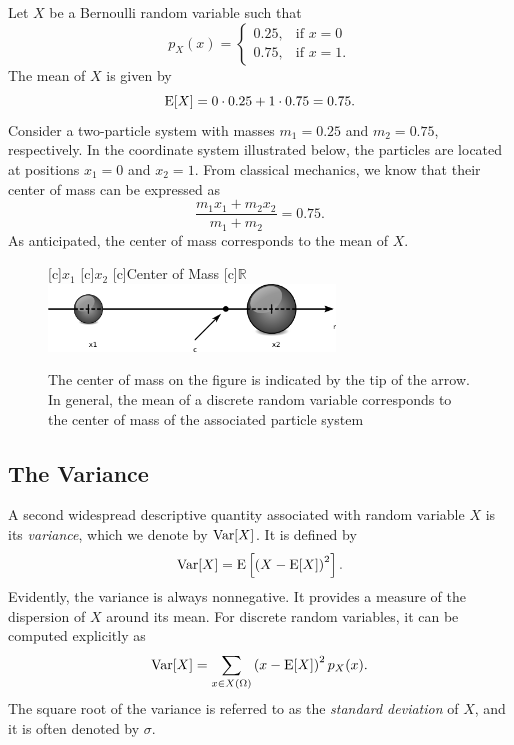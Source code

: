 \begin{example}
Let $X$ be a Bernoulli random variable such that
\begin{equation*}
p_X (x) = \left\{ \begin{array}{ll}
0.25, & \text{if }x = 0 \\
0.75, & \text{if }x = 1.
\end{array} \right.
\end{equation*}
The mean of $X$ is given by
\begin{equation*}
\mathrm{E} [X] = 0 \cdot 0.25 + 1 \cdot 0.75 = 0.75 .
\end{equation*}
Consider a two-particle system with masses $m_1 = 0.25$ and $m_2 = 0.75$, respectively.
In the coordinate system illustrated below, the particles are located at positions $x_1 = 0$ and $x_2 = 1$.
From classical mechanics, we know that their center of mass can be expressed as
\begin{equation*}
\frac{ m_1 x_1 + m_2 x_2 }{ m_1 + m_2 } = 0.75 .
\end{equation*}
As anticipated, the center of mass corresponds to the mean of $X$.

\begin{figure}[ht]
\begin{center}
\begin{psfrags}
[c]{$x_1$}
[c]{$x_2$}
[c]{Center of Mass}
[c]{$\mathbb{R}$}
\includegraphics[height=1.8cm]{Figures/6Chapter/mass}
\end{psfrags}
\end{center}
\caption{The center of mass on the figure is indicated by the tip of the arrow.
In general, the mean of a discrete random variable corresponds to the center of mass of the associated particle system}
\end{figure}
\end{example}


\subsection{The Variance}

A second widespread descriptive quantity associated with random variable $X$ is its \emph{variance}, which we denote by $\mathrm{Var} [X]$. 
It is defined by
\begin{equation} \label{equation:VarianceExplicit}
\mathrm{Var} [X] = \mathrm{E} \left[ \left( X - \mathrm{E} [X] \right)^2 \right] .
\end{equation}
Evidently, the variance is always nonnegative.
It provides a measure of the dispersion of $X$ around its mean.
For discrete random variables, it can be computed explicitly as
\begin{equation*}
\mathrm{Var} [X] = \sum_{x \in X(\Omega)} \left( x - \mathrm{E} [X] \right)^2 p_X (x) .
\end{equation*}
The square root of the variance is referred to as the \emph{standard deviation} of $X$, and it is often denoted by $\sigma$. 

